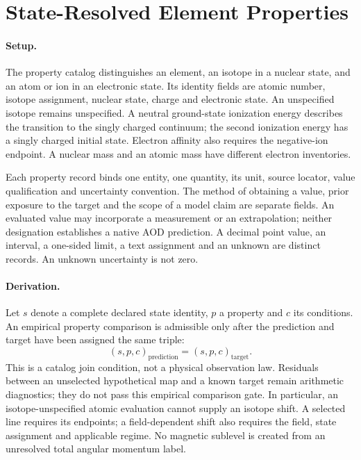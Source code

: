 \section{State-Resolved Element Properties}
\label{manual2:element-properties}

\paragraph{Setup.}
The property catalog distinguishes an element, an isotope in a nuclear state,
and an atom or ion in an electronic state. Its identity fields are atomic
number, isotope assignment, nuclear state, charge and electronic state. An
unspecified isotope remains unspecified. A neutral ground-state ionization
energy describes the transition to the singly charged continuum; the second
ionization energy has a singly charged initial state. Electron affinity also
requires the negative-ion endpoint. A nuclear mass and an atomic mass have
different electron inventories.

Each property record binds one entity, one quantity, its unit, source locator,
value qualification and uncertainty convention. The method of obtaining a
value, prior exposure to the target and the scope of a model claim are separate
fields. An evaluated value may incorporate a measurement or an extrapolation;
neither designation establishes a native AOD prediction. A decimal point value,
an interval, a one-sided limit, a text assignment and an unknown are distinct
records. An unknown uncertainty is not zero.

\paragraph{Derivation.}
Let \(s\) denote a complete declared state identity, \(p\) a property and
\(c\) its conditions. An empirical property comparison is admissible only after the
prediction and target have been assigned the same triple:
\begin{equation}
  (s,p,c)_{\mathrm{prediction}}=(s,p,c)_{\mathrm{target}}.
  \label{eq:manual2-property-identity}
\end{equation}
This is a catalog join condition, not a physical observation law. Residuals
between an unselected hypothetical map and a known target remain arithmetic
diagnostics; they do not pass this empirical comparison gate. In particular,
an isotope-unspecified atomic evaluation cannot supply an isotope shift.
A selected line requires its endpoints; a field-dependent shift also requires
the field, state assignment and applicable regime. No magnetic sublevel is
created from an unresolved total angular momentum label.

